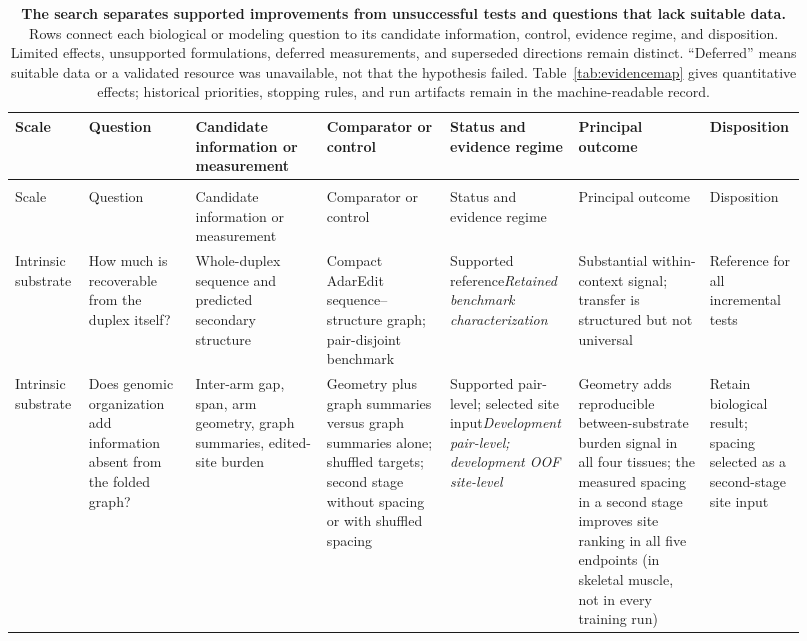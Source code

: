 \begin{landscape}
\begingroup
\fontsize{7.5}{8.6}\selectfont\sffamily
\setlength{\tabcolsep}{3pt}
\renewcommand{\arraystretch}{1.15}
\begin{longtable}{>{\raggedright\arraybackslash}p{0.09\linewidth}>{\raggedright\arraybackslash}p{0.13\linewidth}>{\raggedright\arraybackslash}p{0.16\linewidth}>{\raggedright\arraybackslash}p{0.15\linewidth}>{\raggedright\arraybackslash}p{0.12\linewidth}>{\raggedright\arraybackslash}p{0.16\linewidth}>{\raggedright\arraybackslash}p{0.11\linewidth}}
\caption{\textbf{The search separates supported improvements from unsuccessful tests and questions that lack suitable data.} Rows connect each biological or modeling question to its candidate information, control, evidence regime, and disposition. Limited effects, unsupported formulations, deferred measurements, and superseded directions remain distinct. ``Deferred'' means suitable data or a validated resource was unavailable, not that the hypothesis failed. Table~\ref{tab:evidencemap} gives quantitative effects; historical priorities, stopping rules, and run artifacts remain in the machine-readable record.}\label{tab:taxonomy}\\
\toprule
Scale & Question & Candidate information or measurement & Comparator or control & Status and evidence regime & Principal outcome & Disposition \\
\midrule
\endfirsthead
\multicolumn{7}{l}{\textit{Table continued}}\\
\toprule
Scale & Question & Candidate information or measurement & Comparator or control & Status and evidence regime & Principal outcome & Disposition \\
\midrule
\endhead
Intrinsic substrate & How much is recoverable from the duplex itself? & Whole-duplex sequence and predicted secondary structure & Compact AdarEdit sequence--structure graph; pair-disjoint benchmark & Supported reference\newline\textit{Retained benchmark characterization} & Substantial within-context signal; transfer is structured but not universal & Reference for all incremental tests \\
Intrinsic substrate & Does genomic organization add information absent from the folded graph? & Inter-arm gap, span, arm geometry, graph summaries, edited-site burden & Geometry plus graph summaries versus graph summaries alone; shuffled targets; second stage without spacing or with shuffled spacing & Supported pair-level; selected site input\newline\textit{Development pair-level; development OOF site-level} & Geometry adds reproducible between-substrate burden signal in all four tissues; the measured spacing in a second stage improves site ranking in all five endpoints (in skeletal muscle, not in every training run) & Retain biological result; spacing selected as a second-stage site input \\

\end{longtable}
\end{landscape}
